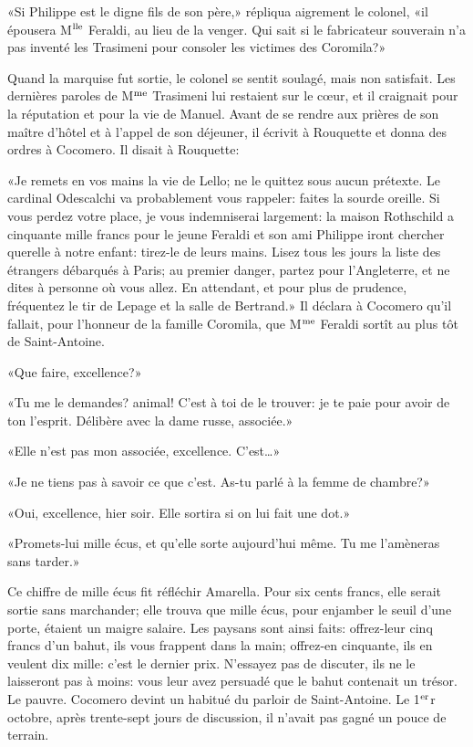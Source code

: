«Si Philippe est le digne fils de son père,» répliqua aigrement le colonel, «il épousera M$\textsuperscript{lle}$ Feraldi, au lieu de la venger. Qui sait si le fabricateur souverain n'a pas inventé les Trasimeni pour consoler les victimes des Coromila?»

\enlargethispage{\baselineskip}

Quand la marquise fut sortie, le colonel se sentit soulagé, mais non satisfait. Les dernières paroles de M$\textsuperscript{me}$ Trasimeni lui restaient sur le c\oe{}ur, et il craignait pour la réputation et pour la vie de Manuel. Avant de se rendre aux prières de son maître d'hôtel et à l'appel de son déjeuner, il écrivit à Rouquette et donna des ordres à Cocomero. Il disait à Rouquette:

«Je remets en vos mains la vie de Lello; ne le quittez sous aucun prétexte. Le cardinal Odescalchi va probablement vous rappeler: faites la sourde oreille. Si vous perdez votre place, je vous indemniserai largement: la maison Rothschild a cinquante mille francs pour le jeune Feraldi et son ami Philippe iront chercher querelle à notre enfant: tirez-le de leurs mains. Lisez tous les jours la liste des étrangers débarqués à Paris; au premier danger, partez pour l'Angleterre, et ne dites à personne où vous allez. En attendant, et pour plus de prudence, fréquentez le tir de Lepage et la salle de Bertrand.» Il déclara à Cocomero qu'il fallait, pour l'honneur de la famille Coromila, que M$\textsuperscript{me}$ Feraldi sortît au plus tôt de Saint-Antoine.

«Que faire, excellence?»

«Tu me le demandes? animal! C'est à toi de le trouver: je te paie pour avoir de ton l'esprit. Délibère avec la dame russe, associée.»

«Elle n'est pas mon associée, excellence. C'est\ldots{}»

«Je ne tiens pas à savoir ce que c'est. As-tu parlé à la femme de chambre?»

«Oui, excellence, hier soir. Elle sortira si on lui fait une dot.»

«Promets-lui mille écus, et qu'elle sorte aujourd'hui même. Tu me l'amèneras sans tarder.»

Ce chiffre de mille écus fit réfléchir Amarella. Pour six cents francs, elle serait sortie sans marchander; elle trouva que mille écus, pour enjamber le seuil d'une porte, étaient un maigre salaire. Les paysans sont ainsi faits: offrez-leur cinq francs d'un bahut, ils vous frappent dans la main; offrez-en cinquante, ils en veulent dix mille: c'est le dernier prix. N'essayez pas de discuter, ils ne le laisseront pas à moins: vous leur avez persuadé que le bahut contenait un trésor. Le pauvre. Cocomero devint un habitué du parloir de Saint-Antoine. Le 1$\textsuperscript{er}$r octobre, après trente-sept jours de discussion, il n'avait pas gagné un pouce de terrain.

